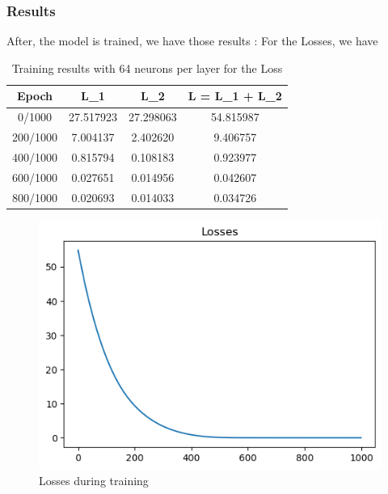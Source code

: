 \documentclass{report}
\begin{document}
        \subsubsection{Results}
            After, the model is trained, we have those results :
            For the Losses, we have 
            \begin{table}[h]
                \centering
                \begin{tabular}{|c|c|c|c|}
                \hline
                Epoch & L_{1} & L_{2} & L = L_{1} + L_{2} \\
                \hline
                0/1000 & 27.517923 & 27.298063 & 54.815987 \\
                200/1000 & 7.004137 & 2.402620 & 9.406757 \\
                400/1000 & 0.815794 & 0.108183 & 0.923977 \\
                600/1000 & 0.027651 & 0.014956 & 0.042607 \\
                800/1000 & 0.020693 & 0.014033 & 0.034726 \\
                \hline
                \end{tabular}
                \caption{Training results with 64 neurons per layer for the Loss}

            \end{table}

            \begin{figure}[h]
                \centering
                \includegraphics[width=\textwidth]{./images/losses.png}
                \caption{Losses during training}
                \label{fig:losses}
            \end{figure}
\end{document}
